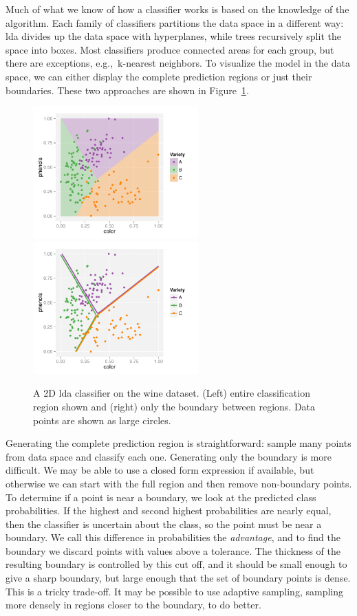 \documentclass[preprint]{imsart}
\begin{document}
Much of what we know of how a classifier works is based on the knowledge of the algorithm.  Each family of classifiers partitions the data space in a different way: {\sc lda} \citep{fisher:1936} divides up the data space with hyperplanes, while trees \citep{breiman:1984} recursively split the space into boxes.  Most classifiers produce connected areas for each group, but there are exceptions, e.g.,\ k-nearest neighbors.  To visualize the model in the data space, we can either display the complete prediction regions or just their boundaries.  These two approaches are shown in Figure~\ref{fig:2d}.

\begin{figure}[htbp]
	\centering
	\includegraphics[height=2in]{class-2d-shade.pdf}
	\includegraphics[height=2in]{class-2d-boundary}
	\caption{A 2D {\sc lda} classifier on the wine dataset.  (Left) entire classification region shown and (right) only the boundary between regions.  Data points are shown as large circles.}
	\label{fig:2d}
\end{figure}

Generating the complete prediction region is straightforward: sample many points from data space and classify each one.  Generating only the boundary is more difficult.  We may be able to use a closed form expression if available, but otherwise we can start with the full region and then remove non-boundary points.  To determine if a point is near a boundary, we look at the predicted class probabilities.  If the highest and second highest probabilities are nearly equal, then the classifier is uncertain about the class, so the point must be near a boundary. We call this difference in probabilities the {\em advantage}, and to find the boundary we discard points with values above a tolerance.  The thickness of the resulting boundary is controlled by this cut off, and it should be small enough to give a sharp boundary, but large enough that the set of boundary points is dense.  This is a tricky trade-off.  It may be possible to use adaptive sampling, sampling more densely in regions closer to the boundary, to do better.
\end{document}
